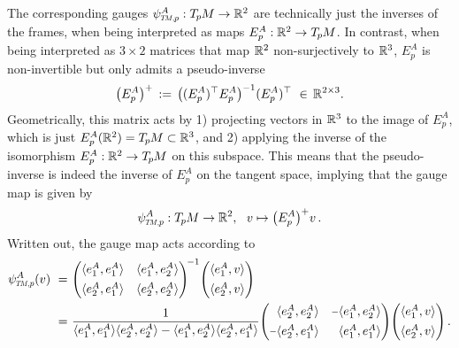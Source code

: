The corresponding gauges $\psiTMp^A: \TpM \to \R^2$ are technically just the inverses of the frames, when being interpreted as maps $E^A_p: \mathbb{R}^2 \to T_{\mkern-1.5mu p}\mkern-.5muM$.
In contrast, when being interpreted as $3\times 2$ matrices that map $\mathbb{R}^2$ non-surjectively to $\mathbb{R}^3$, $E^A_p$ is non-invertible but only admits a pseudo-inverse
\begin{align}
    \big(E^A_p \big)^+ \,:=\, \big( (E^A_p)^\top E^A_p \big)^{-1} (E^A_p)^\top \ \in\, \mathbb{R}^{2\times 3} .
\end{align}
Geometrically, this matrix acts by
1) projecting vectors in $\mathbb{R}^3$ to the image of $E_p^A$, which is just $E_p^A(\mathbb{R}^2) = T_{\mkern-1.5mu p}\mkern-.5muM \subset \mathbb{R}^3$, and
2) applying the inverse of the isomorphism $E_p^A: \mathbb{R}^2 \to T_{\mkern-1.5mu p}\mkern-.5muM$ on this subspace.
This means that the pseudo-inverse is indeed the inverse of $E_p^A$ on the tangent space, implying that the gauge map is given by
\begin{align}
    \psiTMp^A: \TpM \to \R^2, \ \ v \mapsto \big(E_p^A \big)^+ v \,.
\end{align}
Written out, the gauge map acts according to
\begin{align}
    \psiTMp^A(v)\ =&\ 
    \Bigg( \mkern-9mu
    \begin{array}{cc}
        \langle e_1^A, e_1^A \rangle    & \langle e_1^A, e_2^A \rangle \\[4pt]
        \langle e_2^A, e_1^A \rangle    & \langle e_2^A, e_2^A \rangle
    \end{array}
    \mkern-9mu \Bigg)^{\!-1}
    \Bigg( \mkern-9mu
    \begin{array}{cc}
        \langle e_1^A, v \rangle \\[4pt]
        \langle e_2^A, v \rangle
    \end{array}
    \mkern-9mu \Bigg)
    \notag \\
    \ =&\ 
    \frac{1}{
          \langle e_1^A, e_1^A \rangle \langle e_2^A, e_2^A \rangle
        - \langle e_1^A, e_2^A \rangle \langle e_2^A, e_1^A \rangle
    }
    \Bigg( \mkern-9mu
    \begin{array}{cc}
        \phantom{\minus}\langle e_2^A, e_2^A \rangle   &          \minus \langle e_1^A, e_2^A \rangle \\[4pt]
                 \minus \langle e_2^A, e_1^A \rangle   & \phantom{\minus}\langle e_1^A, e_1^A \rangle
    \end{array}
    \mkern-9mu \Bigg)
    \Bigg( \mkern-9mu
    \begin{array}{cc}
        \langle e_1^A, v \rangle \\[4pt]
        \langle e_2^A, v \rangle
    \end{array}
    \mkern-9mu \Bigg) \,.
\end{align}
